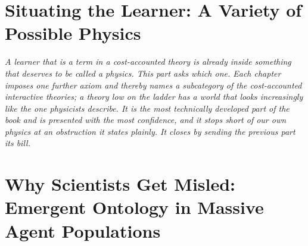 \documentclass[12pt,openright,twoside]{book}
\theoremstyle{remark}
\theoremstyle{plain}
\theoremstyle{remark}
\theoremstyle{plain}
\theoremstyle{plain}
\begin{document}
\bigskip


\part{Situating the Learner: A Variety of Possible Physics}
\label{part:physics}

\vspace{1em}
\begin{mdframed}[backgroundcolor=remarkgray, linecolor=gray!60,
                 linewidth=1pt, topline=false, rightline=false,
                 bottomline=false]
\small\itshape
A learner that is a term in a cost-accounted theory is already inside
something that deserves to be called a physics.
This part asks which one.
Each chapter imposes one further axiom and thereby names a subcategory of
the cost-accounted interactive theories; a theory low on the ladder has a
world that looks increasingly like the one physicists describe.
It is the most technically developed part of the book and is presented
with the most confidence, and it stops short of our own physics at an
obstruction it states plainly.
It closes by sending the previous part its bill.
\end{mdframed}

\bigskip


\part{Why Scientists Get Misled: Emergent Ontology in Massive Agent Populations}
\label{part:sciencebot}
\end{document}
